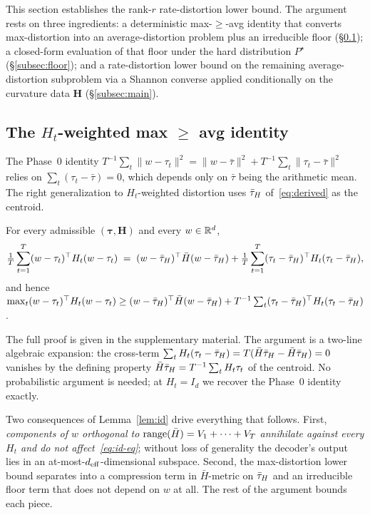 This section establishes the rank-$r$ rate-distortion lower
bound. The argument rests on three ingredients: a deterministic
max-$\geq$-avg identity that converts max-distortion into an
average-distortion problem plus an irreducible floor
(\S\ref{subsec:id}); a closed-form evaluation of that floor under
the hard distribution $P^\star$
(\S\ref{subsec:floor}); and a rate-distortion lower bound on the
remaining average-distortion subproblem via a Shannon converse
applied conditionally on the curvature data $\boldsymbol H$
(\S\ref{subsec:main}).

\subsection{The $H_t$-weighted max $\geq$ avg identity}
\label{subsec:id}

The Phase~0 identity $T^{-1}\sum_t\|w-\tau_t\|^2 = \|w-\bar\tau
\|^2 + T^{-1}\sum_t\|\tau_t-\bar\tau\|^2$ relies on
$\sum_t(\tau_t-\bar\tau) = 0$, which depends only on $\bar\tau$
being the arithmetic mean. The right generalization to
$H_t$-weighted distortion uses $\bar{\tau}_H$ of~\eqref{eq:derived} as
the centroid.

\begin{lemma}\label{lem:id}
For every admissible $(\boldsymbol\tau, \boldsymbol H)$ and every
$w\in\mathbb{R}^d$,
\begin{equation}\label{eq:id-eq}
  \tfrac1T\sum_{t=1}^T (w-\tau_t)^\top H_t (w-\tau_t)
  \;=\; (w-\bar{\tau}_H)^\top\bar H(w-\bar{\tau}_H) + \tfrac1T\sum_{t=1}^T
  (\tau_t-\bar{\tau}_H)^\top H_t (\tau_t-\bar{\tau}_H),
\end{equation}
and hence
$\max_t (w-\tau_t)^\top H_t(w-\tau_t) \geq
(w-\bar{\tau}_H)^\top\bar H(w-\bar{\tau}_H) + T^{-1}\sum_t (\tau_t-\bar{\tau}_H)^\top
H_t (\tau_t-\bar{\tau}_H)$.
\end{lemma}

The full proof is given in the supplementary material. The
argument is a two-line algebraic expansion: the cross-term
$\sum_t H_t(\tau_t-\bar{\tau}_H) = T(\bar H\bar{\tau}_H - \bar H\bar{\tau}_H) = 0$
vanishes by the defining property $\bar H\bar{\tau}_H = T^{-1}\sum_t
H_t\tau_t$ of the centroid. No probabilistic argument is needed;
at $H_t = I_d$ we recover the Phase~0 identity exactly.

Two consequences of Lemma~\ref{lem:id} drive everything that
follows. First, \emph{components of $w$ orthogonal to
$\operatorname{range}(\bar H) = V_1+\cdots+V_T$ annihilate against every $H_t$
and do not affect~\eqref{eq:id-eq}}; without loss of generality
the decoder's output lies in an at-most-$d_{\mathrm{eff}}$-dimensional
subspace. Second, the max-distortion lower bound separates into a
compression term in $\bar H$-metric on $\bar{\tau}_H$ and an irreducible
floor term that does not depend on $w$ at all. The rest of the
argument bounds each piece.


